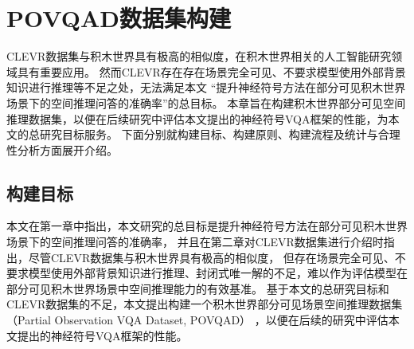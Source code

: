 \chapter{POVQAD数据集构建}\label{dataset}
CLEVR数据集与积木世界具有极高的相似度，在积木世界相关的人工智能研究领域具有重要应用。
然而CLEVR存在存在场景完全可见、不要求模型使用外部背景知识进行推理等不足之处，无法满足本文
“提升神经符号方法在部分可见积木世界场景下的空间推理问答的准确率”的总目标。
本章旨在构建积木世界部分可见空间推理数据集，以便在后续研究中评估本文提出的神经符号VQA框架的性能，为本文的总研究目标服务。
下面分别就构建目标、构建原则、构建流程及统计与合理性分析方面展开介绍。
\section{构建目标}
本文在第一章中指出，本文研究的总目标是提升神经符号方法在部分可见积木世界场景下的空间推理问答的准确率，
并且在第二章对CLEVR数据集进行介绍时指出，尽管CLEVR数据集与积木世界具有极高的相似度，
但存在场景完全可见、不要求模型使用外部背景知识进行推理、封闭式唯一解的不足，难以作为评估模型在部分可见积木世界场景中空间推理能力的有效基准。
基于本文的总研究目标和CLEVR数据集的不足，本文提出构建一个积木世界部分可见场景空间推理数据集（Partial Observation VQA Dataset, POVQAD）
，以便在后续的研究中评估本文提出的神经符号VQA框架的性能。

